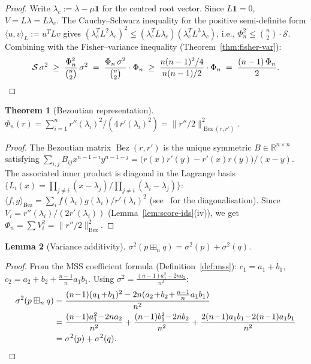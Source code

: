 \documentclass[10pt,a4paper]{amsart}
\theoremstyle{plain}
\newtheorem{theorem}{Theorem}[section]
\newtheorem{lemma}[theorem]{Lemma}
\theoremstyle{definition}
\theoremstyle{remark}
\newcommand{\R}{\mathbb{R}}
\newcommand{\fp}{\boxplus_n}
\DeclareMathOperator{\Bez}{Bez}
\begin{document}
\begin{proof}
Write $\lambda_c:=\lambda-\mu\mathbf{1}$ for the centred root vector.
Since $L\mathbf{1}=0$, $V=L\lambda=L\lambda_c$.
The Cauchy--Schwarz inequality for the positive semi-definite form
$\langle u,v\rangle_L:=u^TLv$ gives
$(\lambda_c^T L^2\lambda_c)^2
\le(\lambda_c^T L\lambda_c)(\lambda_c^T L^3\lambda_c)$,
i.e., $\Phi_n^2\le\binom{n}{2}\cdot\mathcal{S}$.
Combining with the Fisher--variance inequality
(Theorem~\ref{thm:fisher-var}):
\[
  \mathcal{S}\,\sigma^2
  \;\ge\;\frac{\Phi_n^2}{\binom{n}{2}}\,\sigma^2
  \;=\;\frac{\Phi_n\,\sigma^2}{\binom{n}{2}}\cdot\Phi_n
  \;\ge\;\frac{n(n-1)^2/4}{n(n-1)/2}\cdot\Phi_n
  \;=\;\frac{(n-1)\,\Phi_n}{2}.\qedhere
\]
\end{proof}

\begin{theorem}[Bezoutian representation]
\label{thm:bez}
$\Phi_n(r)=\sum_{i=1}^n r''(\lambda_i)^2
/(4\,r'(\lambda_i)^2)
=\|r''/2\|^2_{\Bez(r,r')}$.
\end{theorem}

\begin{proof}
The Bezoutian matrix $\Bez(r,r')$ is the unique symmetric
$B\in\R^{n\times n}$ satisfying
$\sum_{i,j}B_{ij}x^{n-1-i}y^{n-1-j}
=\bigl(r(x)r'(y)-r'(x)r(y)\bigr)/(x-y)$.
The associated inner product is diagonal in the Lagrange basis
$\{L_i(x)=\prod_{j\ne i}(x-\lambda_j)/\prod_{j\ne i}(\lambda_i-\lambda_j)\}$:
$\langle f,g\rangle_{\Bez}=\sum_i f(\lambda_i)g(\lambda_i)/r'(\lambda_i)^2$
(see~\cite{fiedler} for the diagonalisation).
Since $V_i=r''(\lambda_i)/(2r'(\lambda_i))$
(Lemma~\ref{lem:score-ids}(iv)), we get
$\Phi_n=\sum V_i^2=\|r''/2\|^2_{\Bez}$.
\end{proof}

\begin{lemma}[Variance additivity]\label{lem:var-add}
$\sigma^2(p\fp q)=\sigma^2(p)+\sigma^2(q)$.
\end{lemma}

\begin{proof}
From the MSS coefficient formula (Definition~\ref{def:mss}):
$c_1=a_1+b_1$, $c_2=a_2+b_2+\frac{n-1}{n}a_1 b_1$.
Using $\sigma^2=\frac{(n-1)a_1^2-2na_2}{n^2}$:
\begin{align*}
  \sigma^2(p\fp q)
  &=\frac{(n\!-\!1)(a_1\!+\!b_1)^2-2n(a_2\!+\!b_2\!+\!\tfrac{n-1}{n}a_1 b_1)}{n^2}\\
  &=\frac{(n\!-\!1)a_1^2\!-\!2na_2}{n^2}
   +\frac{(n\!-\!1)b_1^2\!-\!2nb_2}{n^2}
   +\frac{2(n\!-\!1)a_1b_1\!-\!2(n\!-\!1)a_1b_1}{n^2}\\
  &=\sigma^2(p)+\sigma^2(q).\qedhere
\end{align*}
\end{proof}
\end{document}
